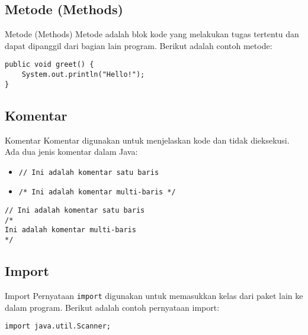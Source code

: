 \documentclass[aspectratio=169, table]{beamer}
\begin{document}
\subsection{Metode (Methods)}
\begin{frame}[fragile]{Metode (Methods)}
Metode adalah blok kode yang melakukan tugas tertentu dan dapat dipanggil dari bagian lain program. Berikut adalah contoh metode:

\begin{lstlisting}[style=JavaStyle]
public void greet() {
	System.out.println("Hello!");
}
\end{lstlisting}
\end{frame}

\subsection{Komentar}
\begin{frame}[fragile]{Komentar}
Komentar digunakan untuk menjelaskan kode dan tidak dieksekusi. Ada dua jenis komentar dalam Java:

\begin{itemize}
\item \texttt{// Ini adalah komentar satu baris}
\item \texttt{/* Ini adalah komentar multi-baris */}
\end{itemize}

\begin{lstlisting}[style=JavaStyle]
// Ini adalah komentar satu baris
/*
Ini adalah komentar multi-baris
*/
\end{lstlisting}
\end{frame}

\subsection{Import}
\begin{frame}[fragile]{Import}
Pernyataan \texttt{import} digunakan untuk memasukkan kelas dari paket lain ke dalam program. Berikut adalah contoh pernyataan import:

\begin{lstlisting}[style=JavaStyle]
import java.util.Scanner;
\end{lstlisting}
\end{frame}
\end{document}
